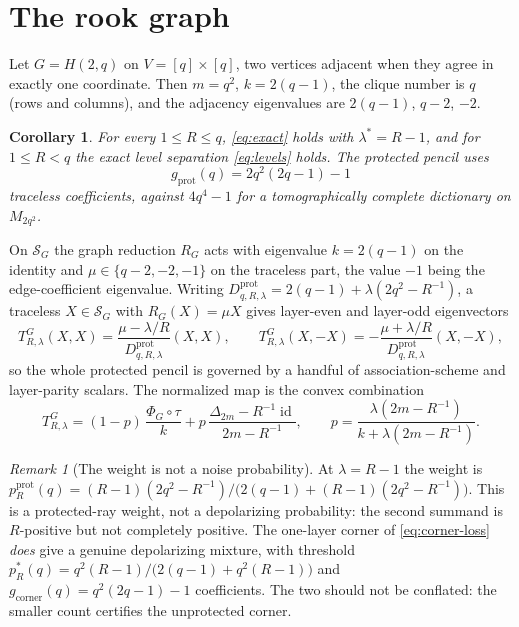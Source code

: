 \documentclass[11pt,reqno]{amsart}
\theoremstyle{plain}
\newtheorem{corollary}[theorem]{Corollary}
\theoremstyle{remark}
\newtheorem{remark}[theorem]{Remark}
\DeclareMathOperator{\id}{id}
\newcommand{\cS}{\mathcal S}
\begin{document}
\section{The rook graph}

Let $G=H(2,q)$ on $V=[q]\times[q]$, two vertices adjacent when they agree in
exactly one coordinate.  Then $m=q^2$, $k=2(q-1)$, the clique number is $q$
(rows and columns), and the adjacency eigenvalues are $2(q-1)$, $q-2$, $-2$.

\begin{corollary}
\label{cor:rook}
For every $1\le R\le q$, \cref{eq:exact} holds with $\lambda^*=R-1$, and for
$1\le R<q$ the exact level separation \cref{eq:levels} holds.  The protected
pencil uses
\[
    g_{\mathrm{prot}}(q)=2q^2(2q-1)-1
\]
traceless coefficients, against $4q^4-1$ for a tomographically complete
dictionary on $M_{2q^2}$.
\end{corollary}

On $\cS_G$ the graph reduction $R_G$ acts with eigenvalue $k=2(q-1)$ on the
identity and $\mu\in\{q-2,-2,-1\}$ on the traceless part, the value $-1$ being
the edge-coefficient eigenvalue.  Writing
$D^{\mathrm{prot}}_{q,R,\lambda}=2(q-1)+\lambda(2q^2-R^{-1})$, a traceless
$X\in\cS_G$ with $R_G(X)=\mu X$ gives layer-even and layer-odd eigenvectors
\[
    T^G_{R,\lambda}(X,X)=\frac{\mu-\lambda/R}{D^{\mathrm{prot}}_{q,R,\lambda}}(X,X),
    \qquad
    T^G_{R,\lambda}(X,-X)=-\frac{\mu+\lambda/R}{D^{\mathrm{prot}}_{q,R,\lambda}}(X,-X),
\]
so the whole protected pencil is governed by a handful of association-scheme
and layer-parity scalars.  The normalized map is the convex combination
\[
    T^G_{R,\lambda}
    =(1-p)\,\frac{\Phi_G\circ\tau}{k}
     +p\,\frac{\Delta_{2m}-R^{-1}\id}{2m-R^{-1}},
    \qquad
    p=\frac{\lambda(2m-R^{-1})}{k+\lambda(2m-R^{-1})} .
\]

\begin{remark}[The weight is not a noise probability]
At $\lambda=R-1$ the weight is
$p^{\mathrm{prot}}_R(q)=(R-1)(2q^2-R^{-1})\big/\bigl(2(q-1)+(R-1)(2q^2-R^{-1})\bigr)$.
This is a protected-ray weight, not a depolarizing probability: the second
summand is $R$-positive but not completely positive.  The one-layer corner of
\cref{eq:corner-loss} \emph{does} give a genuine depolarizing mixture, with
threshold $p^*_R(q)=q^2(R-1)/\bigl(2(q-1)+q^2(R-1)\bigr)$ and
$g_{\mathrm{corner}}(q)=q^2(2q-1)-1$ coefficients.  The two should not be
conflated: the smaller count certifies the unprotected corner.
\end{remark}
\end{document}
